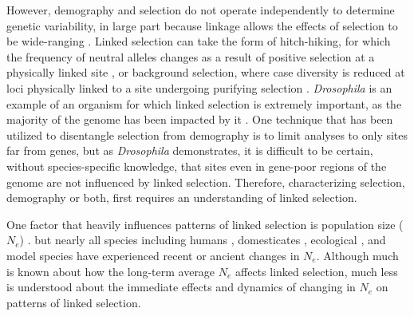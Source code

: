 \documentclass{pnastwo}
\newcommand{\jri}[1]{\textcolor{red}{\scriptsize #1}}
\begin{document}
\begin{article}
However, demography and selection do not operate independently to determine genetic variability, in large part because linkage allows the effects of selection to be wide-ranging \cite{smith1974, li2012,slotte2014}. Linked selection can take the form of hitch-hiking, for which the frequency of neutral alleles changes as a result of positive selection at a physically linked site \cite{smith1974}, or background selection, where case diversity is reduced at loci physically linked to a site undergoing purifying selection \cite{charlesworth1993}. \emph{Drosophila} is an example of an organism for which linked selection is extremely important, as the majority of the genome has been impacted by it \cite{sella2009}. One technique that has been utilized to disentangle selection from demography is to limit analyses to only sites far from genes\cite{gazave2014}, but as \emph{Drosophila} demonstrates, it is difficult to be certain, without species-specific knowledge, that sites even in gene-poor regions of the genome are not influenced by linked selection. Therefore, characterizing selection, demography or both, first requires an understanding of linked selection.

One factor that heavily influences patterns of linked selection is population size ($N_e$) \cite{cutter2013, slotte2014}. but nearly all species including humans \cite{reich1998}, domesticates \cite{hyten2006, bovine2009}, ecological \cite{storfer2014}, and model species \cite{duchen2013} have experienced recent or ancient changes in $N_e$. Although much is known about how the long-term average $N_e$ affects linked selection, much less is understood about the immediate effects and dynamics of changing in $N_e$ on patterns of linked selection.



\end{article}
\end{document}
